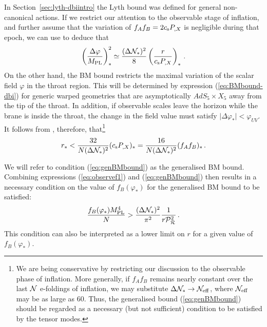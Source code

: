 In Section~\ref{sec:lyth-dbiintro} the Lyth bound was defined for general
non-canonical actions. 
If we restrict our attention to 
the observable stage of inflation, and further assume that the variation
of $f_Af_B = 2 c_\mathrm{s}P_{,X}$ is negligible during that epoch, we can use
 to deduce that 
% 
\begin{equation}
\label{eq:genphivary1}
\left( \frac{\Delta \varphi}{M_{\mathrm{PL}}} \right)^2_{*} \simeq 
\frac{(\Delta \mathcal{N}_{*} )^2}{8} \left(\frac{r}{c_\mathrm{s}P_{,X}}\right)_*  \,.
\end{equation}
% 
On the other hand, the BM bound restricts the maximal 
variation of the scalar field $\varphi$ in the throat region. 
This will be determined by expression (\ref{eq:BMbound-dbi}) 
for generic warped geometries that are asymptotically 
$AdS_5 \times X_5$ away from the tip of the throat. In addition, 
if observable scales leave the horizon 
while the brane is inside the throat, the change in the field value 
must satisfy $| \Delta \varphi_*|<\varphi_{UV}$. It follows from   
, therefore, that\footnote{We are 
being conservative by restricting our discussion to the 
observable phase of inflation. More generally, if 
$f_Af_B$ remains nearly constant over the last $\mathcal{N}$ 
e-foldings of inflation, 
we may substitute $\Delta \mathcal{N}_* \rightarrow 
\mathcal{N}_\mathrm{eff}$, where $\mathcal{N}_\mathrm{eff}$ 
may be as large as 60. Thus, the generalised bound 
(\ref{eq:genBMbound}) should be regarded as a necessary 
(but not sufficient) condition to be satisfied by the tensor modes.} 
% 
\begin{equation}
\label{eq:genBMbound}
r_*< \frac{32}{N (\Delta \mathcal{N}_{*})^2} (c_\mathrm{s}P_{,X})_* = \frac{16}{N (\Delta \mathcal{N}_{*})^2}
(f_Af_B)_* \,.
\end{equation}
% 


We will refer to condition 
(\ref{eq:genBMbound}) as the 
generalised BM bound. 
Combining expressions (\ref{eq:observef1}) and (\ref{eq:genBMbound}) then
results in a necessary condition on the value of $f_B(\varphi_*)$ 
for the generalised BM bound to be satisfied:
%  
\begin{equation}
\label{eq:f2bound}
\frac{f_B (\varphi_*)M_{\mathrm{PL}}^4}{N} > \frac{(\Delta \mathcal{N}_*)^2}{\pi^2} 
\frac{1}{r\mathcal{P}_{\mathcal{R}}^2 } \,.
\end{equation}
% 
This condition can also be interpreted as a lower limit on $r$ 
for a given value of $f_B (\varphi_*)$.  


